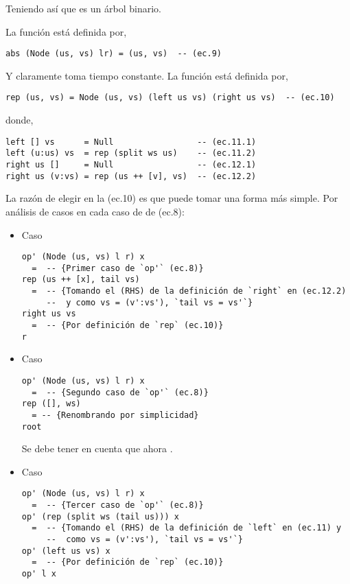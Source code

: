 Teniendo así que  es un árbol binario.

La función  está definida por,
\begin{verbatim}
abs (Node (us, vs) lr) = (us, vs)  -- (ec.9)
\end{verbatim}

Y claramente toma tiempo constante. La función  está definida por,

\begin{verbatim}
rep (us, vs) = Node (us, vs) (left us vs) (right us vs)  -- (ec.10)
\end{verbatim}

donde,
\begin{verbatim}
left [] vs      = Null                 -- (ec.11.1)
left (u:us) vs  = rep (split ws us)    -- (ec.11.2)
right us []     = Null                 -- (ec.12.1)
right us (v:vs) = rep (us ++ [v], vs)  -- (ec.12.2)
\end{verbatim}

La razón de elegir  en la (ec.10) es que  puede tomar una forma más simple.
Por análisis de casos en cada caso de  de (ec.8):

\begin{itemize}
\item Caso 
\begin{verbatim}
op' (Node (us, vs) l r) x
  =  -- {Primer caso de `op'` (ec.8)}
rep (us ++ [x], tail vs)
  =  -- {Tomando el (RHS) de la definición de `right` en (ec.12.2) 
     --  y como vs = (v':vs'), `tail vs = vs'`}
right us vs
  =  -- {Por definición de `rep` (ec.10)}
r
\end{verbatim}

\item Caso 
\begin{verbatim}
op' (Node (us, vs) l r) x
  =  -- {Segundo caso de `op'` (ec.8)}
rep ([], ws)
  = -- {Renombrando por simplicidad}
root
\end{verbatim}
Se debe tener en cuenta que ahora .

\item Caso 
\begin{verbatim}
op' (Node (us, vs) l r) x
  =  -- {Tercer caso de `op'` (ec.8)}
op' (rep (split ws (tail us))) x
  =  -- {Tomando el (RHS) de la definición de `left` en (ec.11) y 
     --  como vs = (v':vs'), `tail vs = vs'`}
op' (left us vs) x
  =  -- {Por definición de `rep` (ec.10)}
op' l x
\end{verbatim}
\end{itemize}

